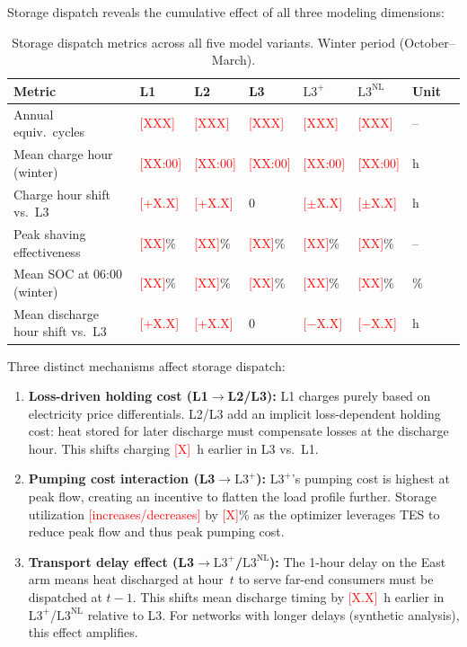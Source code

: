 \documentclass[review,3p]{elsarticle}
\newcommand{\placeholder}[1]{\textcolor{red}{[#1]}}
\newcommand{\Lplus}{\mathrm{L3}^{+}}
\newcommand{\Lnl}{\mathrm{L3}^{\mathrm{NL}}}
\begin{document}
Storage dispatch reveals the cumulative effect of all three
modeling dimensions:

\begin{table}[htbp]
\centering
\caption{Storage dispatch metrics across all five model variants.
Winter period (October--March).}
\label{tab:storage}
\begin{tabular}{@{}llllllll@{}}
\toprule
Metric & L1 & L2 & L3 & $\Lplus$ & $\Lnl$ & Unit \\
\midrule
Annual equiv.\ cycles
  & \placeholder{XXX} & \placeholder{XXX}
  & \placeholder{XXX} & \placeholder{XXX}
  & \placeholder{XXX} & -- \\
Mean charge hour (winter)
  & \placeholder{XX:00} & \placeholder{XX:00}
  & \placeholder{XX:00} & \placeholder{XX:00}
  & \placeholder{XX:00} & h \\
Charge hour shift vs.\ L3
  & \placeholder{+X.X} & \placeholder{+X.X} & 0
  & \placeholder{$\pm$X.X} & \placeholder{$\pm$X.X} & h \\
Peak shaving effectiveness
  & \placeholder{XX}\% & \placeholder{XX}\%
  & \placeholder{XX}\% & \placeholder{XX}\%
  & \placeholder{XX}\% & -- \\
Mean SOC at 06:00 (winter)
  & \placeholder{XX}\% & \placeholder{XX}\%
  & \placeholder{XX}\% & \placeholder{XX}\%
  & \placeholder{XX}\% & \% \\
Mean discharge hour shift
vs.\ L3
  & \placeholder{+X.X} & \placeholder{+X.X} & 0
  & \placeholder{$-$X.X} & \placeholder{$-$X.X} & h \\
\bottomrule
\end{tabular}
\end{table}

Three distinct mechanisms affect storage dispatch:

\begin{enumerate}[nosep]
    \item \textbf{Loss-driven holding cost (L1$\to$L2/L3):} L1
    charges purely based on electricity price differentials. L2/L3
    add an implicit loss-dependent holding cost: heat stored for
    later discharge must compensate losses at the discharge hour.
    This shifts charging \placeholder{X}~h earlier in L3 vs.\ L1.

    \item \textbf{Pumping cost interaction (L3$\to\Lplus$):}
    $\Lplus$'s pumping cost is highest at peak flow, creating an
    incentive to flatten the load profile further. Storage
    utilization \placeholder{increases/decreases} by
    \placeholder{X}\% as the optimizer leverages TES to reduce
    peak flow and thus peak pumping cost.

    \item \textbf{Transport delay effect (L3$\to\Lplus$/$\Lnl$):}
    The 1-hour delay on the East arm means heat discharged at
    hour~$t$ to serve far-end consumers must be dispatched at
    $t-1$. This shifts mean discharge timing by
    \placeholder{X.X}~h earlier in $\Lplus$/$\Lnl$ relative to L3.
    For networks with longer delays (synthetic analysis), this
    effect amplifies.
\end{enumerate}
\end{document}
